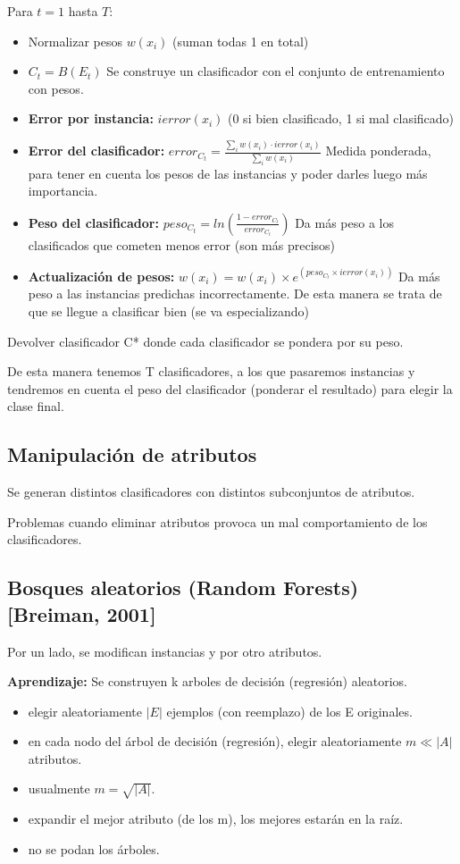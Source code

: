 \documentclass[12pt]{report} %
\begin{document}
Para $t = 1$ hasta $T$:
\begin{itemize}
  \item Normalizar pesos $w(x_i)$ (suman todas 1 en total)
  \item $C_t = B(E_t)$ Se construye un clasificador con el conjunto de entrenamiento con pesos.
  \item \textbf{Error por instancia:} $ierror(x_i)$ (0 si bien clasificado, 1 si mal clasificado)
  \item \textbf{Error del clasificador:} $error_{C_t} = \frac {\sum_i w(x_i)\cdot ierror(x_i)} {\sum_i w(x_i)}$ Medida ponderada, para tener en cuenta los pesos de las instancias y poder darles luego más importancia.
  \item \textbf{Peso del clasificador:} $peso_{C_t} = ln \left( \frac{1-error_{C_t}}{error_{C_t}} \right)$ Da más peso a los clasificados que cometen menos error (son más precisos)
  \item \textbf{Actualización de pesos:} $w(x_i) = w(x_i) \times e^{(peso_{C_t} \times ierror(x_i))}$ Da más peso a las instancias predichas incorrectamente. De esta manera se trata de que se llegue a clasificar bien (se va especializando)
\end{itemize}
Devolver clasificador C* donde cada clasificador se pondera por su peso.

De esta manera tenemos T clasificadores, a los que pasaremos instancias y tendremos en cuenta el peso del clasificador (ponderar el resultado) para elegir la clase final.

\subsection{Manipulación de atributos}
Se generan distintos clasificadores con distintos subconjuntos de atributos.

Problemas cuando eliminar atributos provoca un mal comportamiento de los clasificadores.

\subsection{Bosques aleatorios (Random Forests) [Breiman, 2001]}
Por un lado, se modifican instancias y por otro atributos.

\textbf{Aprendizaje:} Se construyen k arboles de decisión (regresión) aleatorios.
\begin{itemize}
  \item elegir aleatoriamente $|E|$ ejemplos (con reemplazo) de los E originales.
  \item en cada nodo del árbol de decisión (regresión), elegir aleatoriamente $m \ll |A|$ atributos.
  \item usualmente $m = \sqrt{|A|}$.
  \item expandir el mejor atributo (de los m), los mejores estarán en la raíz.
  \item no se podan los árboles.
\end{itemize}
\end{document}
